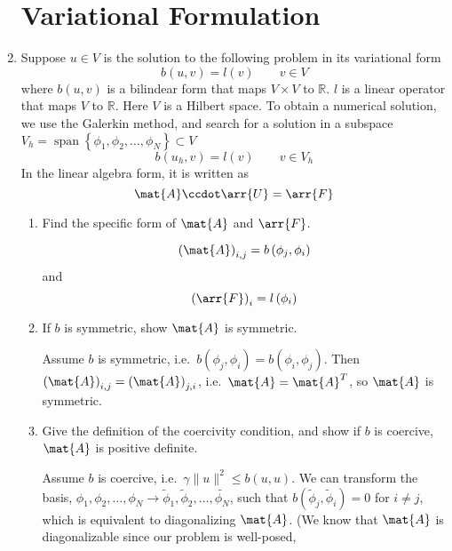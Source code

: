 \documentclass{article}
\newcommand\NoIndent[1]{%
  \begingroup
  \par
  \parshape0
  #1\par
  \endgroup
}
\DeclareMathOperator{\Span}{span}
\begin{document}
\begin{enumerate}
\NoIndent{\section{Variational Formulation}}

	\item Suppose $u \in V$ is the solution to the following problem in its variational form
		\begin{equation*}
			b(u,v) = l(v) \qquad v \in V
		\end{equation*}
		where $b(u,v)$ is a bilindear form that maps $V \times V$ to $\mathbb{R}$.
		$l$ is a linear operator that maps $V$ to $\mathbb{R}$.
		Here $V$ is a Hilbert space.
		To obtain a numerical solution, we use the Galerkin method, and search for a solution in a subspace
		$V_h = \Span\left\{\phi_1,\phi_2,\dots,\phi_N\right\} \subset V$
		\begin{equation*}
			b(u_h,v) = l(v) \qquad v \in V_h
		\end{equation*}
		In the linear algebra form, it is written as
		\begin{equation*}
			\mat{A}\ccdot\arr{U} = \arr{F}
		\end{equation*}
		\begin{enumerate}
			\item Find the specific form of $\mat{A}$ and $\arr{F}$.
\NoIndent{
	\begin{equation*}
		\left(\mat{A}\right)_{i,j} = b\left(\phi_j,\phi_i\right)
	\end{equation*}
	and
	\begin{equation*}
		\left(\arr{F}\right)_i = l\left(\phi_i\right)
	\end{equation*}
}
			\item If $b$ is symmetric, show $\mat{A}$ is symmetric.
\NoIndent{
	Assume $b$ is symmetric, i.e.\ $b\left(\phi_j,\phi_i\right) = b\left(\phi_i,\phi_j\right)$.
	Then $\left(\mat{A}\right)_{i,j} = \left(\mat{A}\right)_{j,i}$, i.e.\ $\mat{A} = \mat{A}^T$,
	so $\mat{A}$ is symmetric.
}
			\item Give the definition of the coercivity condition,
				and show if $b$ is coercive, $\mat{A}$ is positive definite.
\NoIndent{
	Assume $b$ is coercive, i.e.\ $\gamma\|u\|^2 \leq b(u,u)$.
	We can transform the basis,
	$\phi_1,\phi_2,\dots,\phi_N \rightarrow \tilde{\phi}_1,\tilde{\phi}_2,\dots,\tilde{\phi_N}$,
	such that $b\left(\tilde{\phi}_j,\tilde{\phi}_i\right) = 0$ for $i \neq j$,
	which is equivalent to diagonalizing $\mat{A}$.
	(We know that $\mat{A}$ is diagonalizable since our problem is well-posed,
}
\end{enumerate}
\end{enumerate}
\end{document}

